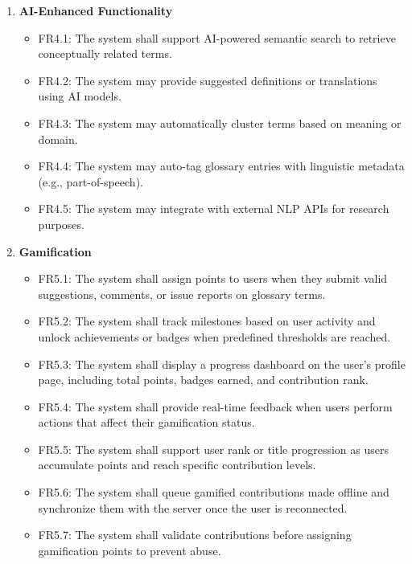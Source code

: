 \documentclass[12pt]{article}
\begin{document}
\begin{enumerate}[label=FR\arabic*:, leftmargin=2.5em]
    \item \textbf{AI-Enhanced Functionality}
    \begin{itemize}
        \item FR4.1: The system shall support AI-powered semantic search to retrieve conceptually related terms.
        \item FR4.2: The system may provide suggested definitions or translations using AI models.
        \item FR4.3: The system may automatically cluster terms based on meaning or domain.
        \item FR4.4: The system may auto-tag glossary entries with linguistic metadata (e.g., part-of-speech).
        \item FR4.5: The system may integrate with external NLP APIs for research purposes.
    \end{itemize}

    \item \textbf{Gamification}
    \begin{itemize}
        \item FR5.1: The system shall assign points to users when they submit valid suggestions, comments, or issue reports on glossary terms.
        \item FR5.2: The system shall track milestones based on user activity and unlock achievements or badges when predefined thresholds are reached.
        \item FR5.3: The system shall display a progress dashboard on the user's profile page, including total points, badges earned, and contribution rank.
        \item FR5.4: The system shall provide real-time feedback when users perform actions that affect their gamification status.
        \item FR5.5: The system shall support user rank or title progression as users accumulate points and reach specific contribution levels.
        \item FR5.6: The system shall queue gamified contributions made offline and synchronize them with the server once the user is reconnected.
        \item FR5.7: The system shall validate contributions before assigning gamification points to prevent abuse.
    \end{itemize}


\end{enumerate}
\end{document}
